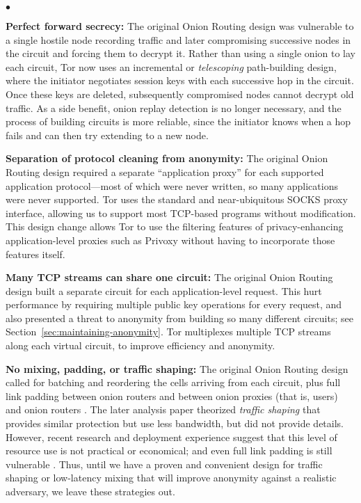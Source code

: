 \documentclass[times,10pt,twocolumn]{article}
\newenvironment{tightlist}{\begin{list}{$\bullet$}{
  \setlength{\itemsep}{0mm}
    \setlength{\parsep}{0mm}
    }}{\end{list}}
\begin{document}
\begin{tightlist}

\item \textbf{Perfect forward secrecy:} The original Onion Routing
design was vulnerable to a single hostile node recording traffic and later
compromising successive nodes in the circuit and forcing them to
decrypt it. 
Rather than using a single onion to lay each circuit,
Tor now uses an incremental or \emph{telescoping}
path-building design, where the initiator negotiates session keys with
each successive hop in the circuit.  Once these keys are deleted,
subsequently compromised nodes cannot decrypt old traffic.
As a side benefit, onion replay detection is no longer
necessary, and the process of building circuits is more reliable, since
the initiator knows when a hop fails and can then try extending to a new node.


\item \textbf{Separation of protocol cleaning from anonymity:}
The original Onion Routing design required a separate ``application
proxy'' for each
supported application protocol---most
of which were never written, so many applications were never supported.
Tor uses the standard and near-ubiquitous SOCKS
\cite{socks4,socks5} proxy interface, allowing us to support most TCP-based
programs without modification.  This design change allows Tor to
use the filtering features of privacy-enhancing
application-level proxies such as Privoxy \cite{privoxy} without having to
incorporate those features itself.

\item \textbf{Many TCP streams can share one circuit:} The original
Onion Routing design built a separate circuit for each application-level
request.
This hurt performance by requiring multiple public key operations for
every request, and also presented
a threat to anonymity from building so many different circuits; see
Section~\ref{sec:maintaining-anonymity}.
Tor multiplexes multiple TCP streams along each virtual
circuit, to improve efficiency and anonymity.

\item \textbf{No mixing, padding, or traffic shaping:} The original
Onion Routing design called for batching and reordering the cells arriving
from each circuit,
plus full link padding between onion routers and between onion
proxies (that is, users) and onion routers \cite{or-jsac98}. The
later analysis paper \cite{or-pet00} theorized \emph{traffic shaping}
that provides similar protection but use less bandwidth, but did not
provide details. However, recent research \cite{econymics} and deployment
experience \cite{freedom21-security} suggest that this level of resource
use is not practical or economical; and even full link padding is still
vulnerable \cite{defensive-dropping}. Thus, until we have a proven and
convenient design for traffic shaping or low-latency mixing that
will improve anonymity against a realistic adversary, we leave these
strategies out.


\end{tightlist}
\end{document}
